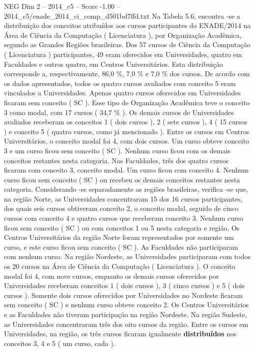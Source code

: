 \begin{textsample}{NEG Dim 2 – 2014\_c5 – Score -1.00 – 2014\_c5/enade\_2014\_ci\_comp\_d501bd7ffd.txt}
Na Tabela 5.6, encontra -se a distribuição dos conceitos atribuídos aos cursos participantes do ENADE/2014 na Área de Ciência da Computação ( Licenciatura ), por Organização Acadêmica, segundo as Grandes Regiões brasileiras.
Dos 57 cursos de Ciência da Computação ( Licenciatura ) participantes, 49 eram oferecidos em Universidades, quatro em Faculdades e outros quatro, em Centros Universitários.
Esta distribuição corresponde a, respectivamente, 86,0 \%, 7,0 \% e 7,0 \% dos cursos.
De acordo com os dados apresentados, todos os quatro cursos avaliados com conceito 5 eram vinculados a Universidades.
Apenas quatro cursos oferecidos em Universidades ficaram sem conceito ( SC ).
Esse tipo de Organização Acadêmica teve o conceito 3 como modal, com 17 cursos ( 34,7 \% ).
Os demais cursos de Universidades avaliados receberam os conceitos 1 ( dois cursos ), 2 ( sete cursos ), 4 ( 15 cursos ) e conceito 5 ( quatro cursos, como já mencionado ).
Entre os cursos em Centros Universitários, o conceito modal foi 4, com dois cursos.
Um curso obteve conceito 3 e um curso ficou sem conceito ( SC ).
Nenhum curso ficou com os demais conceitos restantes nesta categoria.
Nas Faculdades, três dos quatro cursos ficaram com conceito 3, conceito modal.
Um curso ficou com conceito 4.
Nenhum curso ficou sem conceito ( SC ) ou recebeu os demais conceitos restantes nesta categoria.
Considerando -se separadamente as regiões brasileiras, verifica -se que, na região Norte, as Universidades concentraram 15 dos 16 cursos participantes, dos quais seis cursos obtiveram conceito 2, o conceito modal, seguido de cinco cursos com conceito 4 e quatro cursos que receberam conceito 3.
Nenhum curso ficou sem conceito ( SC ) ou com conceitos 1 ou 5 nesta categoria e região.
Os Centros Universitários da região Norte foram representados por somente um curso, e este curso ficou sem conceito ( SC ).
As Faculdades não participaram com nenhum curso.
Na região Nordeste, as Universidades participaram com todos os 20 cursos na Área de Ciência da Computação ( Licenciatura ).
O conceito modal foi 4, com nove cursos, enquanto os demais cursos oferecidos por Universidades receberam conceitos 1 ( dois cursos ), 3 ( cinco cursos ) e 5 ( dois cursos ).
Somente dois cursos oferecidos por Universidades no Nordeste ficaram sem conceito ( SC ) e nenhum curso obteve conceito 2.
Os Centros Universitários e as Faculdades não tiveram participação na região Nordeste.
Na região Sudeste, as Universidades concentraram três dos oito cursos da região.
Entre os cursos em Universidades, na região, os três cursos ficaram igualmente \textbf{distribuídos} nos conceitos 3, 4 e 5 ( um curso, cada ).

\end{textsample}
